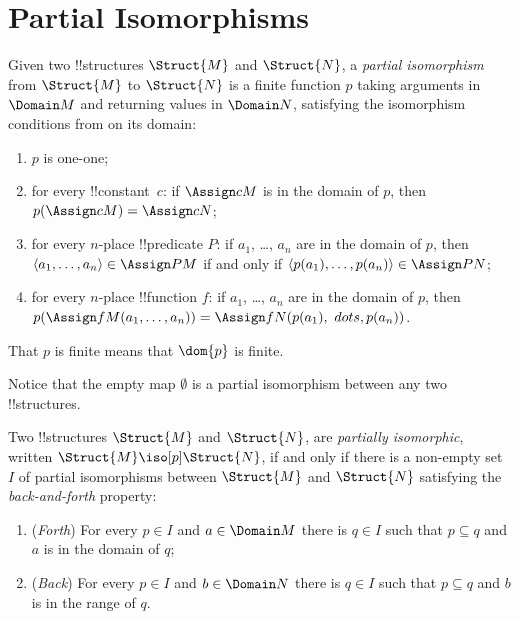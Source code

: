 \documentclass[../../include/open-logic-section]{subfiles}
\begin{document}
\section{Partial Isomorphisms}

\begin{defn}
  Given two !!{structure}s $\Struct{M}$ and $\Struct{N}$, a
  \emph{partial isomorphism} from $\Struct{M}$ to $\Struct{N}$ is a
  finite function $p$ taking arguments in $\Domain M$ and returning
  values in $\Domain N$, satisfying the isomorphism conditions from
   on its domain:
  \begin{enumerate}
  \item $p$ is one-one;
  \item for every !!{constant}~$c$: if $\Assign c M$ is in the domain
    of $p$, then $p(\Assign c M) = \Assign c N$;
  \item for every $n$-place !!{predicate} $P$: if $a_1$, \dots, $a_n$
    are in the domain of $p$, then $\langle a_1, \dots, a_n\rangle \in
    \Assign P M$ if and only if $\langle p(a_1), \dots, p(a_n) \rangle
    \in \Assign P N$;
  \item for every $n$-place !!{function} $f$: if $a_1$, \dots, $a_n$
    are in the domain of $p$, then $p(\Assign f M (a_1, \dots,a_n))
    = \Assign f N (p(a_1), \ dots, p(a_n))$.
  \end{enumerate}
  That $p$ is finite means that $\dom{p}$ is finite.
\end{defn}

Notice that the empty map $\emptyset$ is a partial isomorphism
between any two !!{structure}s.

\begin{defn}
  Two !!{structure}s $\Struct{M}$ and $\Struct{N}$, are
  \emph{partially isomorphic}, written $\Struct{M} \iso[p]
  \Struct{N}$, if and only if there is a non-empty set $I$
  of partial isomorphisms between $\Struct{M}$ and $\Struct{N}$
  satisfying the \emph{back-and-forth} property:
  \begin{enumerate}
  \item (\emph{Forth}) For every $p \in I$ and $a \in \Domain M$
    there is $q \in I$ such that $p \subseteq q$ and $a$ is
    in the domain of $q$;
  \item (\emph{Back}) For every $p \in I$ and $b \in \Domain N$
    there is $q \in I$ such that $p \subseteq q$ and $b$ is
    in the range of $q$.
  \end{enumerate}
\end{defn}
\end{document}
